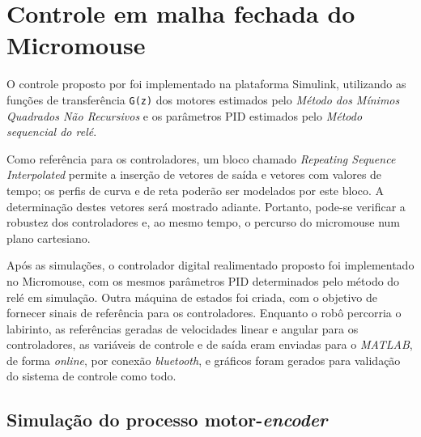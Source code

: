%
%


\section{Controle em malha fechada do Micromouse}
O controle proposto por  foi implementado na plataforma Simulink, utilizando as funções de transferência \texttt{G(z)} dos motores estimados pelo \emph{Método dos Mínimos Quadrados Não Recursivos} e os parâmetros PID estimados pelo \emph{Método sequencial do relé}.

Como referência para os controladores, um bloco chamado \emph{Repeating Sequence Interpolated} permite a inserção de vetores de saída e vetores com valores de tempo; os perfis de curva e de reta poderão ser modelados por este bloco. A determinação destes vetores será mostrado adiante. Portanto, pode-se verificar a robustez dos controladores e, ao mesmo tempo, o percurso do micromouse num plano cartesiano.

Após as simulações, o controlador digital realimentado proposto foi implementado no Micromouse, com os mesmos parâmetros PID determinados pelo método do relé em simulação. Outra máquina de estados foi criada, com o objetivo de fornecer sinais de referência para os controladores. Enquanto o robô percorria o labirinto, as referências geradas de velocidades linear e angular para os controladores, as variáveis de controle e de saída eram enviadas para o \textit{MATLAB}, de forma \emph{online}, por conexão \textit{bluetooth}, e gráficos foram gerados para validação do sistema de controle como todo.

\subsection{Simulação do processo motor-\textit{encoder}}

